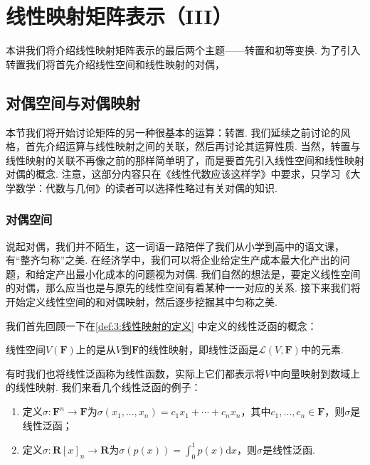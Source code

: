 \chapter{线性映射矩阵表示（III）}

本讲我们将介绍线性映射矩阵表示的最后两个主题——转置和初等变换. 为了引入转置我们将首先介绍线性空间和线性映射的对偶，

\section{对偶空间与对偶映射}

本节我们将开始讨论矩阵的另一种很基本的运算：转置. 我们延续之前讨论的风格，首先介绍运算与线性映射之间的关联，然后再讨论其运算性质. 当然，转置与线性映射的关联不再像之前的那样简单明了，而是要首先引入线性空间和线性映射对偶的概念. 注意，这部分内容只在《线性代数应该这样学》中要求，只学习《大学数学：代数与几何》的读者可以选择性略过有关对偶的知识.

\subsection{对偶空间}

说起对偶，我们并不陌生，这一词语一路陪伴了我们从小学到高中的语文课，有``整齐匀称''之美. 在经济学中，我们可以将企业给定生产成本最大化产出的问题，和给定产出最小化成本的问题视为对偶. 我们自然的想法是，要定义线性空间的对偶，那么应当也是与原先的线性空间有着某种一一对应的关系. 接下来我们将开始定义线性空间的和对偶映射，然后逐步挖掘其中匀称之美.

我们首先回顾一下在\autoref{def:3:线性映射的定义} 中定义的线性泛函的概念：
\begin{definition}
    线性空间$V(\mathbf{F})$上的是从$V$到$\mathbf{F}$的线性映射，即线性泛函是$\mathcal{L}(V,\mathbf{F})$中的元素.
\end{definition}
有时我们也将线性泛函称为线性函数，实际上它们都表示将$V$中向量映射到数域上的线性映射. 我们来看几个线性泛函的例子：
\begin{enumerate}
    \item 定义$\sigma:\mathbf{F}^n\to\mathbf{F}$为$\sigma(x_1,\ldots,x_n)=c_1x_1+\cdots+c_nx_n$，其中$c_1,\ldots,c_n\in\mathbf{F}$，则$\sigma$是线性泛函；

    \item 定义$\sigma:\mathbf{R}[x]_n\to\mathbf{R}$为$\sigma(p(x))=\displaystyle\int_0^1p(x)\mathrm{d}x$，则$\sigma$是线性泛函.
\end{enumerate}

